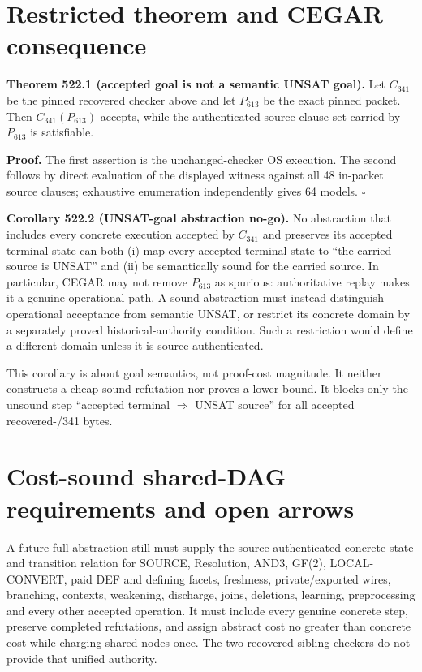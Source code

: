 \documentclass[11pt]{article}
\begin{document}
\section{Restricted theorem and CEGAR consequence}

\textbf{Theorem 522.1 (accepted goal is not a semantic UNSAT goal).}
Let $C_{341}$ be the pinned recovered checker above and let $P_{613}$ be the
exact pinned packet.  Then $C_{341}(P_{613})$ accepts, while the authenticated
source clause set carried by $P_{613}$ is satisfiable.

\textbf{Proof.}  The first assertion is the unchanged-checker OS execution.
The second follows by direct evaluation of the displayed witness against all
48 in-packet source clauses; exhaustive enumeration independently gives 64
models. \hfill$\square$

\textbf{Corollary 522.2 (UNSAT-goal abstraction no-go).}
No abstraction that includes every concrete execution accepted by $C_{341}$
and preserves its accepted terminal state can both (i) map every accepted
terminal state to ``the carried source is UNSAT'' and (ii) be semantically
sound for the carried source.  In particular, CEGAR may not remove
$P_{613}$ as spurious: authoritative replay makes it a genuine operational
path.  A sound abstraction must instead distinguish operational acceptance
from semantic UNSAT, or restrict its concrete domain by a separately proved
historical-authority condition.  Such a restriction would define a different
domain unless it is source-authenticated.

This corollary is about goal semantics, not proof-cost magnitude.  It neither
constructs a cheap sound refutation nor proves a lower bound.  It blocks only
the unsound step ``accepted terminal $\Rightarrow$ UNSAT source'' for all
accepted recovered-/341 bytes.

\section{Cost-sound shared-DAG requirements and open arrows}

A future full abstraction still must supply the source-authenticated concrete
state and transition relation for SOURCE, Resolution, AND3, GF(2),
LOCAL-CONVERT, paid DEF and defining facets, freshness, private/exported wires,
branching, contexts, weakening, discharge, joins, deletions, learning,
preprocessing and every other accepted operation.  It must include every
genuine concrete step, preserve completed refutations, and assign abstract
cost no greater than concrete cost while charging shared nodes once.  The
two recovered sibling checkers do not provide that unified authority.
\end{document}
